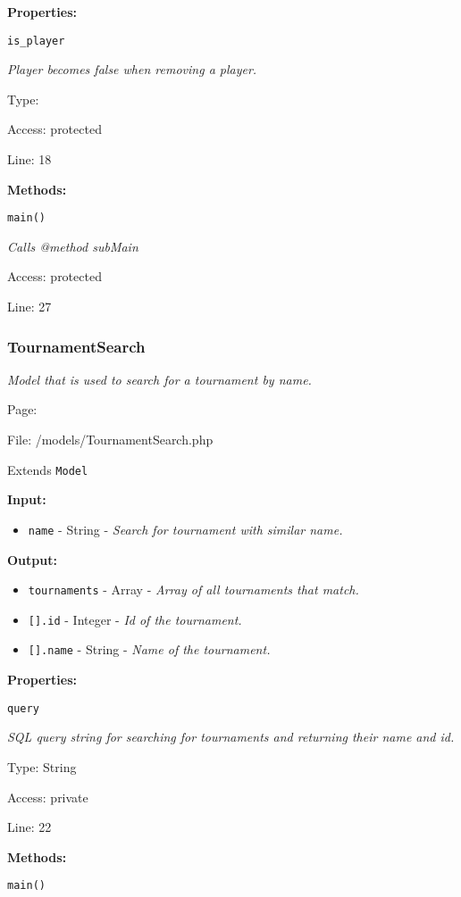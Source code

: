 \textbf{Properties:}

\texttt{is\_player}

{\scriptsize
\textit{Player becomes false when removing a player.}

Type: 

Access: protected

Line: 18

}
\textbf{Methods:}

\texttt{main()}

{\scriptsize
\textit{Calls @method subMain}

Access: protected

Line: 27

}

\subsubsection{TournamentSearch}\label{TournamentSearch.php.doc}
\textit{Model that is used to search for a tournament by name.}

Page: \pageref{TournamentSearch.php}

File: /models/TournamentSearch.php

Extends \texttt{Model}

\textbf{Input:}
\begin{itemize}
\item \texttt{name} - String - \textit{Search for tournament with similar name.}
\end{itemize}

\textbf{Output:}
\begin{itemize}
\item \texttt{tournaments} - Array - \textit{Array of all tournaments that match.}
\item \texttt{[].id} - Integer - \textit{Id of the tournament.}
\item \texttt{[].name} - String - \textit{Name of the tournament.}
\end{itemize}

\textbf{Properties:}

\texttt{query}

{\scriptsize
\textit{SQL query string for searching for tournaments and returning their name and id.}

Type: String

Access: private

Line: 22

}
\textbf{Methods:}

\texttt{main()}

